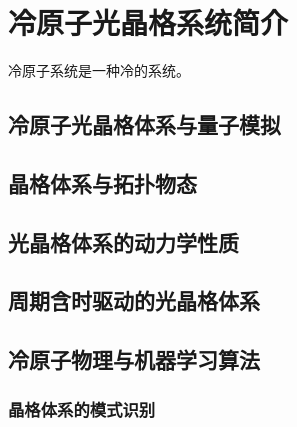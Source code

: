 \chapter{冷原子光晶格系统简介}
\label{cha:intro}

冷原子系统是一种冷的系统。\cite{thuthesis}


\section{冷原子光晶格体系与量子模拟}


\section{晶格体系与拓扑物态}


\section{光晶格体系的动力学性质}


\section{周期含时驱动的光晶格体系}


\section{冷原子物理与机器学习算法}

\subsection{晶格体系的模式识别}